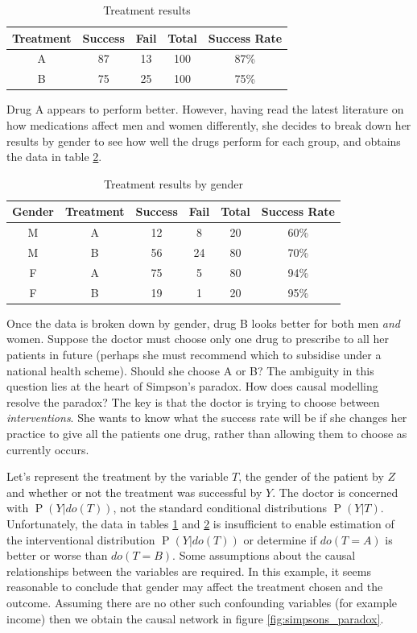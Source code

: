 \documentclass[11pt,a4paper,twoside]{report}
\renewcommand{\P}[1]{\operatorname{P}\left(#1\right)}
\theoremstyle{plain}
\theoremstyle{definition}
\begin{document}
\begin{table}[ht]
\caption{Treatment results}
\label{tab:simpson1}
\center
\begin{tabular}{c c c c c}
Treatment & Success & Fail & Total & Success Rate\\
\hline
\rowcolor[gray]{0.9} 
A &  87 & 13 & 100 & 87\%\\
\rowcolor{white} B & 75 & 25 & 100 & 75\%\\
\hline
\end{tabular}
\end{table}

Drug A appears to perform better. However, having read the latest literature on how medications affect men and women differently, she decides to break down her results by gender to see how well the drugs perform for each group, and obtains the data in table \ref{tab:simpson2}.

\begin{table}[ht]
\caption{Treatment results by gender}
\label{tab:simpson2}
\center
\begin{tabular}{c c c c c c}
Gender & Treatment & Success & Fail & Total & Success Rate\\
\hline
\rowcolor[gray]{0.9}
M & A & 12 & 8 & 20 & 60\%\\
M & B & 56 & 24 & 80 & 70\%\\
\rowcolor[gray]{0.9}
F & A & 75 & 5 & 80 & 94\%\\
F & B & 19 & 1 & 20 & 95\%\\
\hline
\end{tabular}
\end{table}

Once the data is broken down by gender, drug B looks better for both men \emph{and} women. Suppose the doctor must choose only one drug to prescribe to all her patients in future (perhaps she must recommend which to subsidise under a national health scheme). Should she choose A or B? The ambiguity in this question lies at the heart of Simpson's paradox. How does causal modelling resolve the paradox? The key is that the doctor is trying to choose between \emph{interventions}. She wants to know what the success rate will be if she changes her practice to give all the patients one drug, rather than allowing them to choose as currently occurs. 

Let's represent the treatment by the variable $T$, the gender of the patient by $Z$ and whether or not the treatment was successful by $Y$. The doctor is concerned with $\P{Y|do(T)}$, not the standard conditional distributions $\P{Y|T}$. Unfortunately, the data in tables \ref{tab:simpson1} and \ref{tab:simpson2} is insufficient to enable estimation of the interventional distribution $\P{Y|do(T)}$ or determine if $do(T=A)$ is better or worse than $do(T=B)$. Some assumptions about the causal relationships between the variables are required. In this example, it seems reasonable to conclude that gender may affect the treatment chosen and the outcome. Assuming there are no other such confounding variables (for example income) then we obtain the causal network in figure \ref{fig:simpsons_paradox}.
\end{document}
